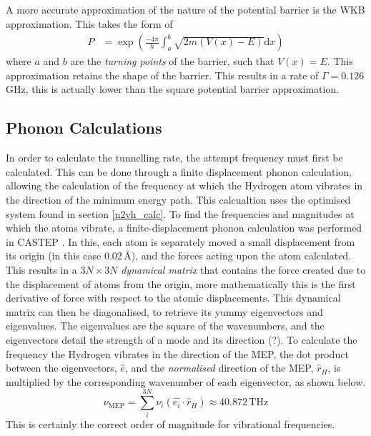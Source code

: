 \documentclass[10pt,a4paper,twocolumn,twoside]{extarticle}
\renewcommand{\d}{\text{d}}
\begin{document}
A more accurate approximation of the nature of the potential barrier is the WKB approximation. This takes the form of 
\begin{align}
    P &= \exp(\frac{-4\pi}{h}\int_{a}^{b}\sqrt{2m(V(x)-E)}{\d}x)
\end{align}
where $a$ and $b$ are the \emph{turning points} of the barrier, such that $V(x) = E$. This approximation retains the shape of the barrier. This results in a rate of $\Gamma = 0.126$\,GHz, this is actually lower than the square potential barrier approximation.


\subsection{Phonon Calculations}
\label{phonon}
In order to calculate the tunnelling rate, the attempt frequency must first be calculated. This can be done through a finite displacement phonon calculation, allowing the calculation of the frequency at which the Hydrogen atom vibrates in the direction of the minimum energy path. This calcualtion uses the optimised system found in section \ref{n2vh_calc}. To find the frequencies and magnitudes at which the atoms vibrate, a finite-displacement phonon calculation was performed in CASTEP \cite{DynamicalMatrix}. In this, each atom is separately moved a small displacement from its origin (in this case $0.02$\,{\AA}), and the forces acting upon the atom calculated. This results in a $3N\times3N$ \emph{dynamical matrix} that contains the force created due to the displacement of atoms from the origin, more mathematically this is the first derivative of force with respect to the atomic displacements. This dynamical matrix can then be diagonalised, to retrieve its yummy eigenvectors and eigenvalues. The eigenvalues are the square of the wavenumbers, and the eigenvectors detail the strength of a mode and its direction (?). To calculate the frequency the Hydrogen vibrates in the direction of the MEP, the dot product between the eigenvectors, $\hat{e}$, and the \emph{normalised} direction of the MEP, $\hat{r}_H$, is multiplied by the corresponding wavenumber of each eigenvector, as shown below. 
\begin{equation}
    \nu_{\text{MEP}} = \sum_{i}^{3N} \nu_i (\hat{e_i} \cdot \hat{r}_H) \approx 40.872\,\text{THz}
\end{equation}
This is certainly the correct order of magnitude for vibrational frequencies. 
\end{document}
